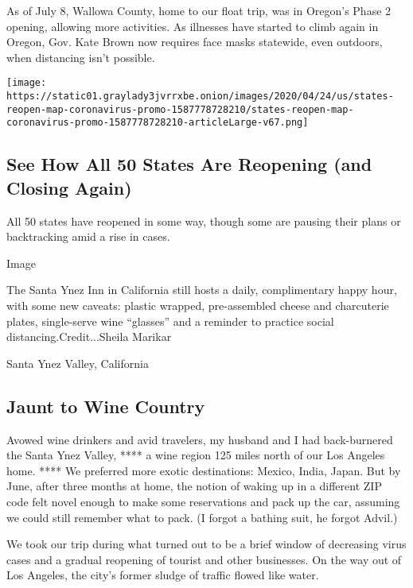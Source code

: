 As of July 8, Wallowa County, home to our float trip, was in Oregon's
Phase 2 opening, allowing more activities. As illnesses have started to
climb again in Oregon, Gov. Kate Brown now requires face masks
statewide, even outdoors, when distancing isn't possible.

\href{https://www.nytimes3xbfgragh.onion/interactive/2020/us/states-reopen-map-coronavirus.html}{}

\texttt{[image: https://static01.graylady3jvrrxbe.onion/images/2020/04/24/us/states-reopen-map-coronavirus-promo-1587778728210/states-reopen-map-coronavirus-promo-1587778728210-articleLarge-v67.png]}

\hypertarget{see-how-all-50-states-are-reopening-and-closing-again}{%
\subsection{See How All 50 States Are Reopening (and Closing
Again)}\label{see-how-all-50-states-are-reopening-and-closing-again}}

All 50 states have reopened in some way, though some are pausing their
plans or backtracking amid a rise in cases.

Image

The Santa Ynez Inn in California still hosts a daily, complimentary
happy hour, with some new caveats: plastic wrapped, pre-assembled cheese
and charcuterie plates, single-serve wine ``glasses'' and a reminder to
practice social distancing.Credit...Sheila Marikar

Santa Ynez Valley, California

\hypertarget{jaunt-to-wine-country}{%
\subsection{Jaunt to Wine Country}\label{jaunt-to-wine-country}}

Avowed wine drinkers and avid travelers, my husband and I had
back-burnered the Santa Ynez Valley, **** a wine region 125 miles north
of our Los Angeles home. **** We preferred more exotic destinations:
Mexico, India, Japan. But by June, after three months at home, the
notion of waking up in a different ZIP code felt novel enough to make
some reservations and pack up the car, assuming we could still remember
what to pack. (I forgot a bathing suit, he forgot Advil.)

We took our trip during what turned out to be a brief window of
decreasing virus cases and a gradual reopening of tourist and other
businesses. On the way out of Los Angeles, the city's former sludge of
traffic flowed like water.

